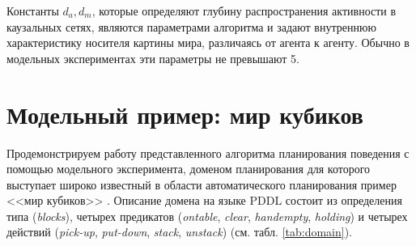 \documentclass[12pt]{scrartcl}
\newcommand{\linesprval}{1}
\begin{document}
	Константы $d_a, d_m$, которые определяют глубину распространения активности в каузальных сетях, являются параметрами алгоритма и задают внутреннюю характеристику носителя картины мира, различаясь от агента к агенту. Обычно в модельных экспериментах эти параметры не превышают 5. 

	\linespread{1}	
	\begin{algorithm}
		\begin{algorithmic}[1]
			
		\end{algorithmic}
	\end{algorithm}
	\linespread{\linesprval}

	\section{Модельный пример: мир кубиков}\label{sec:example}
	
	Продемонстрируем работу представленного алгоритма планирования поведения с помощью модельного эксперимента, доменом планирования для которого выступает широко известный в области автоматического планирования пример <<мир кубиков>> \cite{Gupta1992}. Описание домена на языке PDDL \cite{Gerevini2009} состоит из определения типа (\textit{blocks}), четырех предикатов (\textit{ontable}, \textit{clear}, \textit{handempty}, \textit{holding}) и четырех действий (\textit{pick-up}, \textit{put-down}, \textit{stack}, \textit{unstack}) (см. табл. \ref{tab:domain}).
\end{document}
